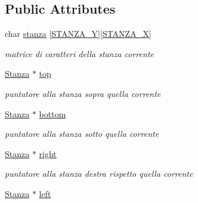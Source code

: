 \subsection*{Public Attributes}
\begin{DoxyCompactItemize}
\item 
\hypertarget{classStanza_a8d01d55aec56b48611025064d84e66de}{}char \hyperlink{classStanza_a8d01d55aec56b48611025064d84e66de}{stanza} \mbox{[}\hyperlink{Stanza_8hpp_a6fbfb5f74a35d56ae39aadb31fddc714}{S\+T\+A\+N\+Z\+A\+\_\+\+Y}\mbox{]}\mbox{[}\hyperlink{Stanza_8hpp_a57d21332cfb3a4adb7041c0db1ada16b}{S\+T\+A\+N\+Z\+A\+\_\+\+X}\mbox{]}\label{classStanza_a8d01d55aec56b48611025064d84e66de}

\begin{DoxyCompactList}\small\item\em matrice di caratteri della stanza corrente \end{DoxyCompactList}\item 
\hypertarget{classStanza_a78ad309c46eb00c0cbcae7b58f4721ef}{}\hyperlink{classStanza}{Stanza} $\ast$ \hyperlink{classStanza_a78ad309c46eb00c0cbcae7b58f4721ef}{top}\label{classStanza_a78ad309c46eb00c0cbcae7b58f4721ef}

\begin{DoxyCompactList}\small\item\em puntatore alla stanza sopra quella corrente \end{DoxyCompactList}\item 
\hypertarget{classStanza_a3c20c96e81f625b1c58525a14ca027c3}{}\hyperlink{classStanza}{Stanza} $\ast$ \hyperlink{classStanza_a3c20c96e81f625b1c58525a14ca027c3}{bottom}\label{classStanza_a3c20c96e81f625b1c58525a14ca027c3}

\begin{DoxyCompactList}\small\item\em puntatore alla stanza sotto quella corrente \end{DoxyCompactList}\item 
\hypertarget{classStanza_ab9fa444357627e27fb3227420c1612c8}{}\hyperlink{classStanza}{Stanza} $\ast$ \hyperlink{classStanza_ab9fa444357627e27fb3227420c1612c8}{right}\label{classStanza_ab9fa444357627e27fb3227420c1612c8}

\begin{DoxyCompactList}\small\item\em puntatore alla stanza destra rispetto quella corrente \end{DoxyCompactList}\item 
\hypertarget{classStanza_aa5b25baa5912ff3be6eef823fd795146}{}\hyperlink{classStanza}{Stanza} $\ast$ \hyperlink{classStanza_aa5b25baa5912ff3be6eef823fd795146}{left}\label{classStanza_aa5b25baa5912ff3be6eef823fd795146}


\end{DoxyCompactItemize}
